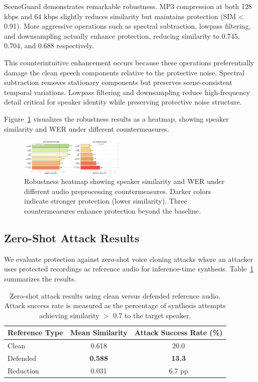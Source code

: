 SceneGuard demonstrates remarkable robustness. MP3 compression at both 128 kbps and 64 kbps slightly reduces similarity but maintains protection (SIM < 0.91). More aggressive operations such as spectral subtraction, lowpass filtering, and downsampling actually enhance protection, reducing similarity to 0.745, 0.704, and 0.688 respectively.

This counterintuitive enhancement occurs because these operations preferentially damage the clean speech components relative to the protective noise. Spectral subtraction removes stationary components but preserves scene-consistent temporal variations. Lowpass filtering and downsampling reduce high-frequency detail critical for speaker identity while preserving protective noise structure.

Figure~\ref{fig:robustness} visualizes the robustness results as a heatmap, showing speaker similarity and WER under different countermeasures.

\begin{figure}[t]
\centering
\includegraphics[width=0.45\textwidth]{figures/fig4_robustness.pdf}
\caption{Robustness heatmap showing speaker similarity and WER under different audio preprocessing countermeasures. Darker colors indicate stronger protection (lower similarity). Three countermeasures enhance protection beyond the baseline.}
\label{fig:robustness}
\end{figure}

\subsection{Zero-Shot Attack Results}

We evaluate protection against zero-shot voice cloning attacks where an attacker uses protected recordings as reference audio for inference-time synthesis. Table~\ref{tab:zeroshot} summarizes the results.

\begin{table}[t]
\centering
\caption{Zero-shot attack results using clean versus defended reference audio. Attack success rate is measured as the percentage of synthesis attempts achieving similarity $>$ 0.7 to the target speaker.}
\label{tab:zeroshot}
\small
\begin{tabular}{lcc}
\toprule
Reference Type & Mean Similarity & Attack Success Rate (\%) \\
\midrule
Clean & 0.618 & 20.0 \\
Defended & \textbf{0.588} & \textbf{13.3} \\
Reduction & 0.031 & 6.7 pp \\
\bottomrule
\end{tabular}
\end{table}

